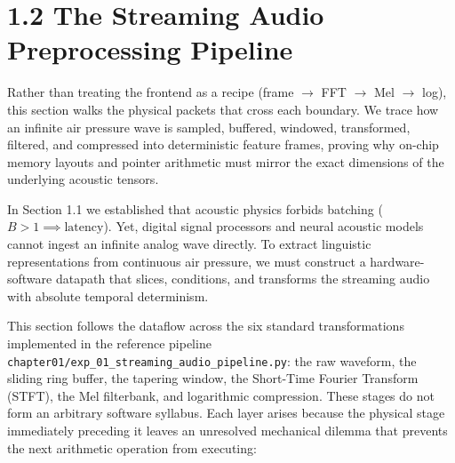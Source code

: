 \documentclass[11pt,a4paper]{article}
\begin{document}
\vspace*{-4mm}
\section*{1.2 The Streaming Audio Preprocessing Pipeline}
\vspace{-1.5mm}

\begin{learningobj}
Rather than treating the frontend as a recipe (frame $\to$ FFT $\to$ Mel $\to$ log), this section walks the physical packets that cross each boundary. We trace how an infinite air pressure wave is sampled, buffered, windowed, transformed, filtered, and compressed into deterministic feature frames, proving why on-chip memory layouts and pointer arithmetic must mirror the exact dimensions of the underlying acoustic tensors.
\end{learningobj}

In Section 1.1 we established that acoustic physics forbids batching ($B > 1 \implies \text{latency}$). Yet, digital signal processors and neural acoustic models cannot ingest an infinite analog wave directly. To extract linguistic representations from continuous air pressure, we must construct a hardware-software datapath that slices, conditions, and transforms the streaming audio with absolute temporal determinism.

This section follows the dataflow across the six standard transformations implemented in the reference pipeline \nolinkurl{chapter01/exp_01_streaming_audio_pipeline.py}: the raw waveform, the sliding ring buffer, the tapering window, the Short-Time Fourier Transform (STFT), the Mel filterbank, and logarithmic compression. These stages do not form an arbitrary software syllabus. Each layer arises because the physical stage immediately preceding it leaves an unresolved mechanical dilemma that prevents the next arithmetic operation from executing:
\end{document}

